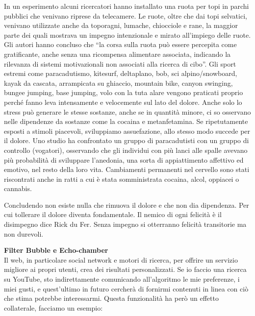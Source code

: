\documentclass[12pt]{book} %
\begin{document}
\begin{mdframed}[linewidth=1pt]
In un esperimento alcuni
ricercatori hanno installato una ruota per topi in parchi pubblici che venivano riprese da telecamere. Le ruote, oltre
che dai topi selvatici, venivano utilizzate anche da toporagni, lumache, chiocciole e rane, la maggior parte dei quali
mostrava un impegno intenzionale e mirato all'impiego delle ruote. Gli autori hanno concluso che
“la corsa sulla ruota può essere percepita come gratificante, anche senza una ricompensa alimentare associata,
indicando la rilevanza di sistemi motivazionali non associati alla ricerca di cibo”. Gli sport estremi come
paracadutismo, kitesurf, deltaplano, bob, sci alpino/snowboard, kayak da cascata, arrampicata su ghiaccio, mountain
bike, canyon swinging, bungee jumping, base jumping, volo con la tuta alare vengono praticati proprio perché fanno leva
intensamente e velocemente sul lato del dolore. Anche solo lo stress può generare le stesse sostanze, anche se in
quantità minore, ci so osservano nelle dipendenze da sostanze come la cocaina e metanfetamina. Se ripetutamente esposti a stimoli piacevoli, sviluppiamo assuefazione, allo stesso modo succede per il dolore. Uno
studio ha confrontato un gruppo di paracadutisti con un gruppo di controllo (vogatori), osservando che gli individui
con più lanci alle spalle avevano più probabilità di sviluppare l'anedonia, una sorta di
appiattimento affettivo ed emotivo, nel resto della loro vita. Cambiamenti permanenti nel cervello sono stati
riscontrati anche in ratti a cui è stata somministrata cocaina, alcol, oppiacei o cannabis. 

Concludendo non esiste nulla che rimuova il dolore e che non dia dipendenza. Per cui tollerare il dolore diventa
fondamentale. Il nemico di ogni felicità è il disimpegno dice Rick du Fer. Senza impegno si otterranno felicità
transitorie ma non durevoli.
\end{mdframed}

\noindent \textbf{\large Filter Bubble e Echo-chamber} \\
Il web, in particolare social network e motori di ricerca, per offrire un servizio migliore ai propri utenti, crea dei
risultati personalizzati. Se io faccio una ricerca su YouTube, sto indirettamente comunicando
all'algoritmo le mie preferenze, i miei gusti, e quest'ultimo in futuro
cercherà di fornirmi contenuti in linea con ciò che stima potrebbe interessarmi. Questa funzionalità ha però un effetto
collaterale, facciamo un esempio:
\end{document}
